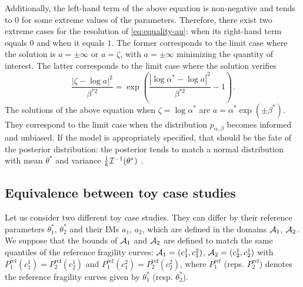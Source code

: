         Additionally, the left-hand term of the above equation is non-negative and tends to $0$ for some extreme values of the parameters.
        Therefore, there exist two extreme cases for the resolution of \cref{eq:equality-au}: when its right-hand term equals $0$ and when it equals $1$. The former corresponds to the limit case where the solution is $a=\pm\infty$ or $a=\zeta$, with $a=\pm\infty$ minimizing the quantity of interest. 
        The latter corresponds to the limit case where the solution verifies
            \begin{equation}
                \frac{|\zeta-\log a|^2}{\beta^{\ast2}} = \exp\left( \frac{|\log\alpha^\ast-\log a|^2}{\beta^{\ast2}} -1\right).
            \end{equation}
        The solutions of the above equation when $\zeta =\log\alpha^\ast$ are $a=\alpha^\ast\exp\left(\pm\beta^\ast\right).$
        They correspond to the limit case when the distribution $p_{\alpha,\beta}$ becomes informed and unbiased. 
        If the model is appropriately specified, that should be the fate of the posterior distribution: the posterior tends to match a normal distribution with mean $\theta^\ast$ and variance $\frac{1}{k}\mathcal{I}^{-1}(\theta^\ast)$ \citep{van_der_vaart_asymptotic_1992}.
    
        
    
    
    
    
    \subsection{Equivalence between toy case studies}\label{app:equiv-toy}
    
        Let us consider two different toy case studies. They can differ by their reference parameters $\theta_1^\ast$, $\theta_2^\ast$ and their IMs $a_1$, $a_2$, which are defined in the domains $\mathcal{A}_1$, $\mathcal{A}_2$.
        We suppose that the bounds of $\mathcal{A}_1$ and $\mathcal{A}_2$ are defined to match the same quantiles of the reference fragility curves: $\mathcal{A}_1=(c_1^1,c_1^2)$, $\mathcal{A}_2=(c_2^1,c_2^1)$ with $P^{\mathrm{ref}}_1(c_1^1)=P^{\mathrm{ref}}_2(c_2^1)$ and $P^{\mathrm{ref}}_1(c_1^2)=P^{\mathrm{ref}}_2(c_2^2)$, where $P^{\mathrm{ref}}_1$ (reps. $P^{\mathrm{ref}}_2$) denotes the reference fragility curves given by $\theta_1^\ast$ (resp. $\theta^\ast_2$).
    
